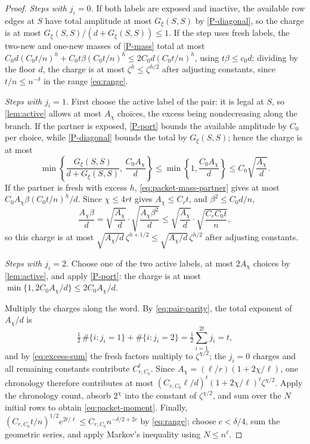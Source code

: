 \documentclass[11pt]{article}
\theoremstyle{definition}
\theoremstyle{remark}
\newcommand{\1}{\mathbf 1}
\numberwithin{equation}{section}
\begin{document}
\begin{proof}
\emph{Steps with $j_i=0$.}  If both labels are exposed and inactive,
the available row edges at $S$ have total amplitude at most
$G_\xi(S,S)$ by \ref{P-diagonal}, so the charge is at most
$G_\xi(S,S)/(d+G_\xi(S,S))\le1$.  If the step uses fresh labels, the
two-new and one-new masses of \ref{P-mass} total at most
$C_0d(C_0t/n)^h+C_0t\beta(C_0t/n)^h\le2C_0d(C_0t/n)^h$, using
$t\beta\le c_0d$; dividing by the floor $d$, the charge is at most
$\zeta^h\le\zeta^{h/2}$ after adjusting constants, since
$t/n\le n^{-\delta}$ in the range \cref{eq:range}.

\emph{Steps with $j_i=1$.}  First choose the active label of the pair:
it is legal at $S$, so \cref{lem:active} allows at most $A_\chi$
choices, the excess being nondecreasing along the branch.  If the
partner is exposed, \ref{P-port} bounds the available amplitude by
$C_0$ per choice, while \ref{P-diagonal} bounds the total by
$G_\xi(S,S)$; hence the charge is at most
\[
 \min\left\{\frac{G_\xi(S,S)}{d+G_\xi(S,S)},\,
 \frac{C_0A_\chi}{d}\right\}
 \le\min\left\{1,\frac{C_0A_\chi}{d}\right\}
 \le C_0\sqrt{\frac{A_\chi}{d}}.
\]
If the partner is fresh with excess $h$,
\cref{eq:packet-mass-partner} gives at most
$C_0A_\chi\beta(C_0t/n)^h/d$.  Since $\chi\le4rt$ gives
$A_\chi\le C_rt$, and $\beta^2\le C_0d/n$,
\[
 \frac{A_\chi\beta}{d}
 =\sqrt{\frac{A_\chi}{d}}\cdot
 \sqrt{\frac{A_\chi\beta^2}{d}}
 \le\sqrt{\frac{A_\chi}{d}}\cdot
 \sqrt{\frac{C_rC_0t}{n}},
\]
so this charge is at most
$\sqrt{A_\chi/d}\,\zeta^{h+1/2}\le\sqrt{A_\chi/d}\,\zeta^{h/2}$ after
adjusting constants.

\emph{Steps with $j_i=2$.}  Choose one of the two active labels, at
most $2A_\chi$ choices by \cref{lem:active}, and apply
\ref{P-port}: the charge is at most
$\min\{1,2C_0A_\chi/d\}\le2C_0A_\chi/d$.

Multiply the charges along the word.  By \cref{eq:pair-parity}, the
total exponent of $A_\chi/d$ is
\[
 \tfrac12\,\#\{i:j_i=1\}+\#\{i:j_i=2\}
 =\tfrac12\sum_{i=1}^{2t}j_i=t,
\]
and by \cref{eq:excess-sum} the fresh factors multiply to
$\zeta^{\chi/2}$; the $j_i=0$ charges and all remaining constants
contribute $C_{r,C_0}^t$.  Since
$A_\chi=(\ell/r)(1+2\chi/\ell)$, one chronology therefore contributes
at most $(C_{r,C_0}\ell/d)^t(1+2\chi/\ell)^t\zeta^{\chi/2}$.  Apply the
chronology count, absorb $2^\chi$ into the constant of
$\zeta^{\chi/2}$, and sum over the $N$ initial rows to obtain
\cref{eq:packet-moment}.  Finally,
$(C_{r,C_0}t/n)^{1/2}e^{2t/\ell}\le C_{r,C_0}n^{-\delta/2+2c}$ by
\cref{eq:range}; choose $c<\delta/4$, sum the geometric series, and
apply Markov's inequality using $N\le n^\ell$.
\end{proof}
\end{document}
